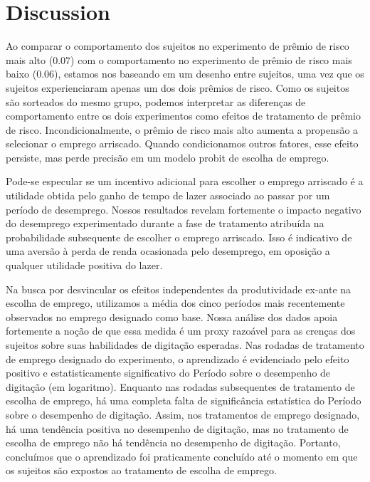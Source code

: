 \documentclass[a4paper,12pt]{article}[abntex2]
\begin{document}
\section{\textbf{Discussion}}

Ao comparar o comportamento dos sujeitos no experimento de prêmio de risco mais alto (\(0.07\)) com o comportamento no experimento de prêmio de risco mais baixo (\(0.06\)), estamos nos baseando em um desenho entre sujeitos, uma vez que os sujeitos experienciaram apenas um dos dois prêmios de risco. Como os sujeitos são sorteados do mesmo grupo, podemos interpretar as diferenças de comportamento entre os dois experimentos como efeitos de tratamento de prêmio de risco. Incondicionalmente, o prêmio de risco mais alto aumenta a propensão a selecionar o emprego arriscado. Quando condicionamos outros fatores, esse efeito persiste, mas perde precisão em um modelo probit de escolha de emprego.

Pode-se especular se um incentivo adicional para escolher o emprego arriscado é a utilidade obtida pelo ganho de tempo de lazer associado ao passar por um período de desemprego. Nossos resultados revelam fortemente o impacto negativo do desemprego experimentado durante a fase de tratamento atribuída na probabilidade subsequente de escolher o emprego arriscado. Isso é indicativo de uma aversão à perda de renda ocasionada pelo desemprego, em oposição a qualquer utilidade positiva do lazer.

Na busca por desvincular os efeitos independentes da produtividade ex-ante na escolha de emprego, utilizamos a média dos cinco períodos mais recentemente observados no emprego designado como base. Nossa análise dos dados apoia fortemente a noção de que essa medida é um proxy razoável para as crenças dos sujeitos sobre suas habilidades de digitação esperadas. Nas rodadas de tratamento de emprego designado do experimento, o aprendizado é evidenciado pelo efeito positivo e estatisticamente significativo do Período sobre o desempenho de digitação (em logaritmo). Enquanto nas rodadas subsequentes de tratamento de escolha de emprego, há uma completa falta de significância estatística do Período sobre o desempenho de digitação. Assim, nos tratamentos de emprego designado, há uma tendência positiva no desempenho de digitação, mas no tratamento de escolha de emprego não há tendência no desempenho de digitação. Portanto, concluímos que o aprendizado foi praticamente concluído até o momento em que os sujeitos são expostos ao tratamento de escolha de emprego.
\end{document}
